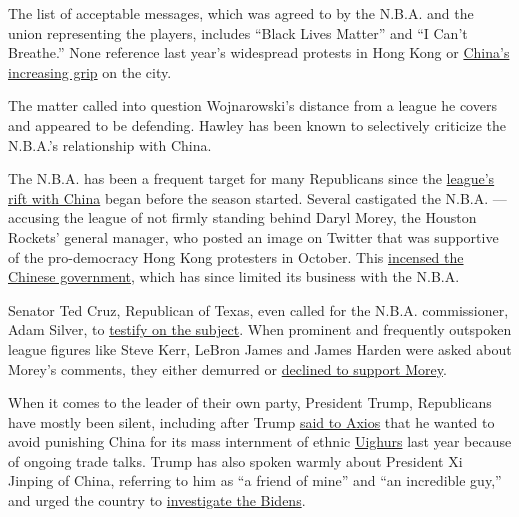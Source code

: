 The list of acceptable messages, which was agreed to by the N.B.A. and
the union representing the players, includes ``Black Lives Matter'' and
``I Can't Breathe.'' None reference last year's widespread protests in
Hong Kong or
\href{https://www.nytimes3xbfgragh.onion/2020/07/08/world/asia/hong-kong-students-protests-china.html}{China's
increasing grip} on the city.

The matter called into question Wojnarowski's distance from a league he
covers and appeared to be defending. Hawley has been known to
selectively criticize the N.B.A.'s relationship with China.

The N.B.A. has been a frequent target for many Republicans since the
\href{https://www.nytimes3xbfgragh.onion/2019/10/06/sports/daryl-morey-rockets-china.html}{league's
rift with China} began before the season started. Several castigated the
N.B.A. --- accusing the league of not firmly standing behind Daryl
Morey, the Houston Rockets' general manager, who posted an image on
Twitter that was supportive of the pro-democracy Hong Kong protesters in
October. This
\href{https://www.nytimes3xbfgragh.onion/2019/10/17/sports/basketball/nba-china-adam-silver.html}{incensed
the Chinese government}, which has since limited its business with the
N.B.A.

Senator Ted Cruz, Republican of Texas, even called for the N.B.A.
commissioner, Adam Silver, to
\href{https://www.dallasnews.com/news/politics/2019/10/13/in-hong-kong-cruz-decries-china-dictatorship-blasts-nba-for-censoring-houston-rockets-gm/}{testify
on the subject}. When prominent and frequently outspoken league figures
like Steve Kerr, LeBron James and James Harden were asked about Morey's
comments, they either demurred or
\href{https://www.nytimes3xbfgragh.onion/2019/10/14/sports/basketball/lebron-james-china.html}{declined
to support Morey}.

When it comes to the leader of their own party, President Trump,
Republicans have mostly been silent, including after Trump
\href{https://t.co/465G1hhrEf?amp=1}{said to Axios} that he wanted to
avoid punishing China for its mass internment of ethnic
\href{https://www.nytimes3xbfgragh.onion/2020/07/06/world/asia/china-xinjiang-uighur-court.html}{Uighurs}
last year because of ongoing trade talks. Trump has also spoken warmly
about President Xi Jinping of China, referring to him as ``a friend of
mine'' and ``an incredible guy,'' and urged the country to
\href{https://www.nytimes3xbfgragh.onion/2019/10/03/us/politics/trump-china-bidens.html}{investigate
the Bidens}.

